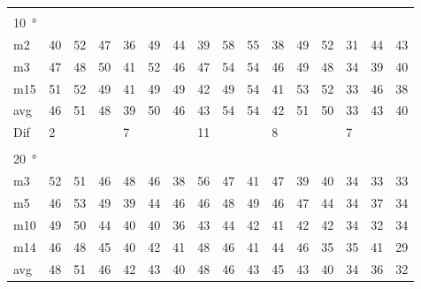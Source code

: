 \begin{table}[H]
\begin{tabular}{l|l|l|l|l|l|l|l|l|l|l|l|l|lll}
 \multicolumn{16}{l}{ } \\                             
\SI{10}{\degree}   & \multicolumn{3}{l|}{} & \multicolumn{3}{l|}{} & \multicolumn{3}{l|}{} & \multicolumn{3}{l|}{} & \multicolumn{3}{l}{}   \\  \hline
m2    &  40    &  52    &  47    &  36    &  49    &   44   &  39    &   58    &   55   &   38    &  49    &  52    & \multicolumn{1}{l|}{31} & \multicolumn{1}{l|}{44} & 43 \\
m3    &  47    &  48    &  50    &   41   &  52    &   46   &   47   &  54     &   54   &   46    & 49     &  48    & \multicolumn{1}{l|}{34} & \multicolumn{1}{l|}{39} & 40 \\
m15  &  51    &  52    &  49    &  41    & 49     &   49   &   42   &   49    &   54   &    41   &   53   &  52    & \multicolumn{1}{l|}{33} & \multicolumn{1}{l|}{46} &  38\\ \hline
avg &  46    & 51     & 48     & 39     &   50   & 46     &  43    &  54     &  54    &  42     & 51     & 50     & \multicolumn{1}{l|}{33} & \multicolumn{1}{l|}{43}  & 40 \\ \hline  
Dif & \multicolumn{3}{l|}{2} & \multicolumn{3}{l|}{7} & \multicolumn{3}{l|}{11} & \multicolumn{3}{l|}{8} & \multicolumn{3}{l}{7} \\     
\multicolumn{16}{l}{ } \\                
\SI{20}{\degree}   & \multicolumn{3}{l|}{} & \multicolumn{3}{l|}{} & \multicolumn{3}{l|}{} & \multicolumn{3}{l|}{} & \multicolumn{3}{l}{}   \\  \hline
m3    &  52    &  51    &  46    &  48    &  46    &  38    &   56   &    47   &  41    &  47     &  39    &  40    & \multicolumn{1}{l|}{34} & \multicolumn{1}{l|}{33} &33  \\
m5    &  46    &  53    &  49    &  39    &  44    & 46     &   46   &  48     &  49    &  46     &  47    &   44   & \multicolumn{1}{l|}{34} & \multicolumn{1}{l|}{37} &34  \\
m10  &  49    &  50    &  44    &  40    &   40   &   36   &   43   &   44    &   42   &  41     & 42     & 42     & \multicolumn{1}{l|}{34} & \multicolumn{1}{l|}{32} &34  \\
m14  &  46    &  48    &  45    &  40    &  42    &   41   &    48  &  46     &   41   &  44     &  46    &  35    & \multicolumn{1}{l|}{35} & \multicolumn{1}{l|}{41} & 29 \\ \hline
avg & 48     &  51    &  46    &   42   &  43    &  40    &  48    &   46    &  43    &  45     & 43     &  40    & \multicolumn{1}{l|}{34} & \multicolumn{1}{l|}{36}  & 32  \\ \hline  

\end{tabular}
\end{table}
